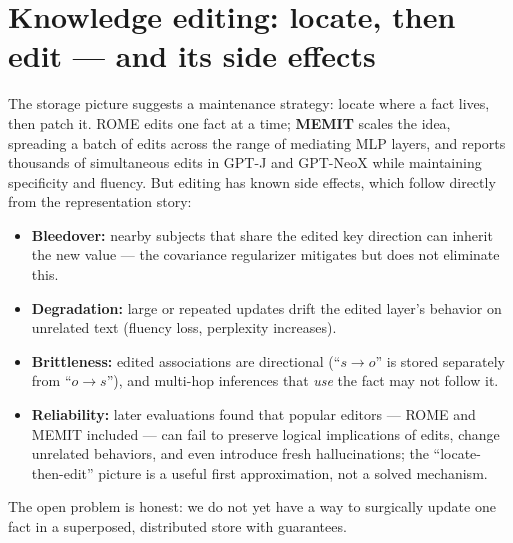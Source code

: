 \documentclass[11pt]{article}
\begin{document}
\section{Knowledge editing: locate, then edit --- and its side effects}
The storage picture suggests a maintenance strategy: locate where a fact lives, then patch it. ROME \cite{meng2022locating} edits one fact at a time; \textbf{MEMIT} \cite{meng2023memit} scales the idea, spreading a batch of edits across the range of mediating MLP layers, and reports thousands of simultaneous edits in GPT-J and GPT-NeoX while maintaining specificity and fluency. But editing has known side effects, which follow directly from the representation story:
\begin{itemize}[noitemsep]
  \item \textbf{Bleedover:} nearby subjects that share the edited key direction can inherit the new value --- the covariance regularizer mitigates but does not eliminate this.
  \item \textbf{Degradation:} large or repeated updates drift the edited layer's behavior on unrelated text (fluency loss, perplexity increases).
  \item \textbf{Brittleness:} edited associations are directional (``$s \to o$'' is stored separately from ``$o \to s$''), and multi-hop inferences that \emph{use} the fact may not follow it.
  \item \textbf{Reliability:} later evaluations found that popular editors --- ROME and MEMIT included --- can fail to preserve logical implications of edits, change unrelated behaviors, and even introduce fresh hallucinations; the ``locate-then-edit'' picture is a useful first approximation, not a solved mechanism.
\end{itemize}
The open problem is honest: we do not yet have a way to surgically update one fact in a superposed, distributed store with guarantees.
\end{document}
